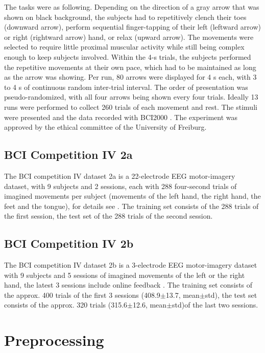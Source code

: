 The tasks were as following. Depending on the direction of a gray arrow
that was shown on black background, the subjects had to repetitively
clench their toes (downward arrow), perform sequential finger-tapping of
their left (leftward arrow) or right (rightward arrow) hand, or relax
(upward arrow). The movements were selected to require little proximal
muscular activity while still being complex enough to keep subjects
involved. Within the 4-s trials, the subjects performed the repetitive
movements at their own pace, which had to be maintained as long as the
arrow was showing. Per run, 80 arrows were displayed for 4 s each, with
3 to 4 s of continuous random inter-trial interval. The order of
presentation was pseudo-randomized, with all four arrows being shown
every four trials. Ideally 13 runs were performed to collect 260 trials
of each movement and rest. The stimuli were presented and the data
recorded with BCI2000 \citep{schalk_bci2000:_2004}. The
experiment was approved by the ethical committee of the University of
Freiburg.

\subsection{BCI Competition IV 2a}\label{bci-competition-iv-2a}

    The BCI competition IV dataset 2a is a 22-electrode EEG motor-imagery
dataset, with 9 subjects and 2 sessions, each with 288 four-second
trials of imagined movements per subject (movements of the left hand,
the right hand, the feet and the tongue), for details see
\citet{brunner_bci_2008}. The training set consists of the
288 trials of the first session, the test set of the 288 trials of the
second session.

\subsection{BCI Competition IV 2b}\label{bci-competition-iv-2b}

    The BCI competition IV dataset 2b is a 3-electrode EEG motor-imagery
dataset with 9 subjects and 5 sessions of imagined movements of the left
or the right hand, the latest 3 sessions include online feedback
\citep{leeb_bci_2008}. The training set consists of the
approx. 400 trials of the first 3 sessions
(408.9$\pm$13.7, mean$\pm$std), the test set consists of the approx. 320 trials (315.6$\pm$12.6, mean$\pm$std)of the last two sessions.

\section{Preprocessing}

